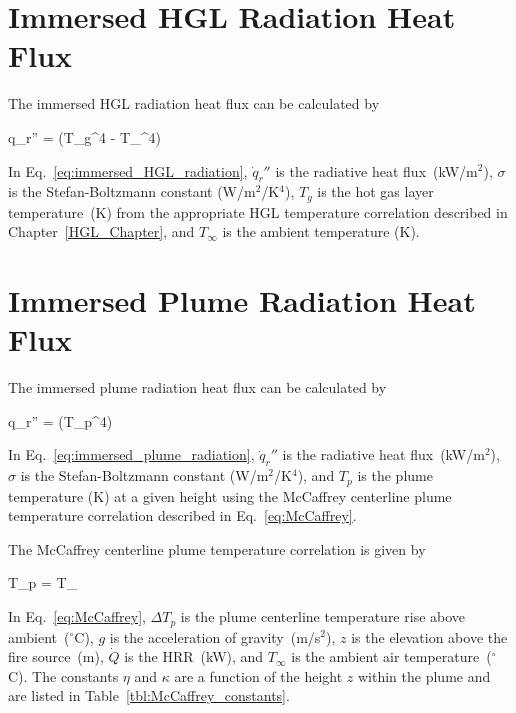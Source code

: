 \clearpage


\section{Immersed HGL Radiation Heat Flux}

The immersed HGL radiation heat flux can be calculated by

\be
\dot q_r'' = \sigma (T_g^4 - T_\infty^4)
\label{eq:immersed_HGL_radiation}
\ee

In Eq.~\ref{eq:immersed_HGL_radiation}, $\dot q_r''$ is the radiative heat flux~(kW/m$^2$), $\sigma$ is the Stefan-Boltzmann constant (W/m$^2$/K$^4$), $T_g$ is the hot gas layer temperature~(K) from the appropriate HGL temperature correlation described in Chapter~\ref{HGL_Chapter}, and $T_\infty$ is the ambient temperature (K).



\section{Immersed Plume Radiation Heat Flux}

The immersed plume radiation heat flux can be calculated by

\be
\dot q_r'' = \sigma (T_p^4)
\label{eq:immersed_plume_radiation}
\ee

In Eq.~\ref{eq:immersed_plume_radiation}, $\dot q_r''$ is the radiative heat flux~(kW/m$^2$), $\sigma$ is the Stefan-Boltzmann constant (W/m$^2$/K$^4$), and $T_p$ is the plume temperature (K) at a given height using the McCaffrey centerline plume temperature correlation described in Eq.~\ref{eq:McCaffrey}.

The McCaffrey centerline plume temperature correlation is given by

\be
\Delta T_p =  T_\infty
\label{eq:McCaffrey}
\ee

In Eq.~\ref{eq:McCaffrey}, $\Delta T_p$ is the plume centerline temperature rise above ambient~($^\circ$C), $g$ is the acceleration of gravity~(m/s$^2$), $z$ is the elevation above the fire source~(m), $\dot Q$ is the HRR~(kW), and $T_\infty$ is the ambient air temperature~($^\circ$C). The constants $\eta$ and $\kappa$ are a function of the height $z$ within the plume and are listed in Table~\ref{tbl:McCaffrey_constants}.

